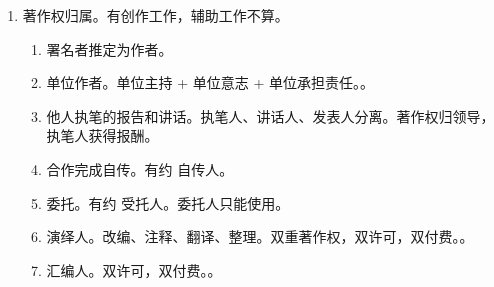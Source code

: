 \begin{enumerate}
\begin{enumerate}
\begin{enumerate}
                \end{enumerate}
          \item 财产权。
                \begin{enumerate}
                  \item 复制。可理解为“原样”抄袭。关于数字化（载体形式变更）。。
                  \item 发行。出售 \hz 赠予方式向公众提供作品的有形载体。
                  \item 出租。仅限软件、视听、录音录像制品作品。
                  \item 展览。仅限美术、摄影。
                  \item 表演。公开/现场表演、机械/间接表演。许可 + 付费。。
                  \item 放映。几乎不考。
                  \item 广播。非现场/现场受众 \yjt 广播电台/大喇叭。
                  \item 信息网络传播。主要针对的是上传到网络的行为。。
                  \item 摄制。。
                  \item 改编。再创作过程。。
                  \item 翻译、汇编。
                  \item 其他。许可（专有、非专有）；转让、出质、出版。
                \end{enumerate}
          \item 保护期限。署名、修改、完整（人身权）无限制，其他最后作者死后 50 年，12/31。
        \end{enumerate}
  \item 著作权归属。有创作工作，辅助工作不算。
        \begin{enumerate}
          \item 署名者推定为作者。
          \item 单位作者。单位主持 + 单位意志 + 单位承担责任。。
          \item 他人执笔的报告和讲话。执笔人、讲话人、发表人分离。著作权归领导，执笔人获得报酬。
          \item 合作完成自传。有约 \yjt 自传人。
          \item 委托。有约 \yjt 受托人。委托人只能使用。
          \item 演绎人。改编、注释、翻译、整理。双重著作权，双许可，双付费。。
          \item 汇编人。双许可，双付费。。

\end{enumerate}
\end{enumerate}
